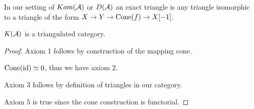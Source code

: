 \documentclass[a4paper, UKenglish]{report}
\begin{document}
In our setting of $Kom(\mathcal{A})$ or $D(\mathcal{A})$ an exact triangle is any triangle isomorphic to a triangle of the form $X \to Y \to \operatorname{Cone}(f) \to X[-1]$.

\begin{proposition}
    $K(\mathcal{A})$ is a  triangulated category.
\end{proposition}

\begin{proof}
    Axiom 1 follows by construction of the mapping cone.

    $\operatorname{Cone}(\operatorname{id}) \simeq 0$, thus we have axiom $2$.

    Axiom $3$ follows by definition of triangles in our category.

    Axiom $5$ is true since the cone construction is functorial.


\end{proof}
\end{document}
